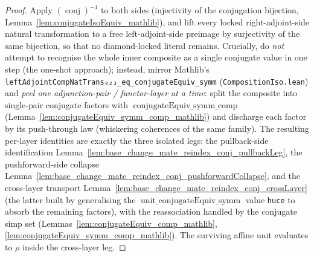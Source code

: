 \begin{proof}
  Apply \((\operatorname{conj})^{-1}\) to both sides (injectivity of the conjugation bijection,
  Lemma~\ref{lem:conjugateIsoEquiv_mathlib}), and lift every locked right-adjoint-side natural
  transformation to a free left-adjoint-side preimage by surjectivity of the same bijection, so that no
  diamond-locked literal remains. Crucially, do \emph{not} attempt to recognise the whole inner
  composite as a single conjugate value in one step (the one-shot approach); instead, mirror
  Mathlib's \texttt{leftAdjointCompNatTrans₀₂₃\_eq\_conjugateEquiv\_symm}
  (\texttt{CompositionIso.lean}) and \emph{peel one adjunction-pair / functor-layer at a time}: split
  the composite into single-pair conjugate factors with \(\operatorname{conjugateEquiv\_symm\_comp}\)
  (Lemma~\ref{lem:conjugateEquiv_symm_comp_mathlib}) and discharge each factor by its push-through law
  (whiskering coherences of the same family). The resulting per-layer identities are exactly the three
  isolated legs: the pullback-side identification
  Lemma~\ref{lem:base_change_mate_reindex_conj_pullbackLeg}, the pushforward-side collapse
  Lemma~\ref{lem:base_change_mate_reindex_conj_pushforwardCollapse}, and the cross-layer transport
  Lemma~\ref{lem:base_change_mate_reindex_conj_crossLayer} (the latter built by generalising the
  \(\operatorname{unit\_conjugateEquiv\_symm}\) value \texttt{huce} to absorb the remaining factors),
  with the reassociation handled by the conjugate simp set (Lemmas~\ref{lem:conjugateEquiv_comp_mathlib},
  \ref{lem:conjugateEquiv_symm_comp_mathlib}). The surviving affine unit evaluates to \(\rho\) inside the
  cross-layer leg.
\end{proof}

